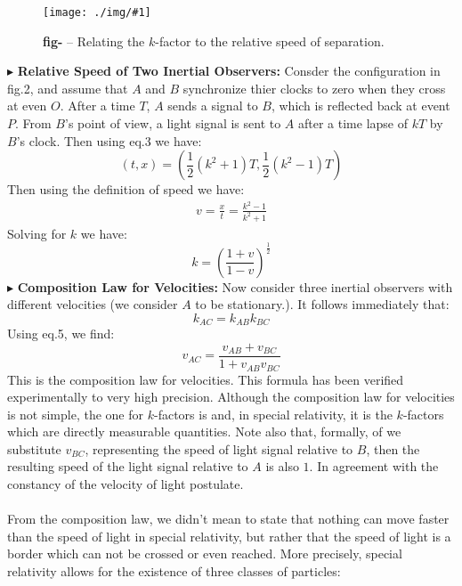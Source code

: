 \documentclass[10pt,a4paper,twocolumn]{article}
\newcounter{def}
\newcounter{figurecounter}
\newcommand{\img}[3]{
    \begin{figure}[h!]
        \centering
        \captionsetup{justification=centering,margin=0cm,labelformat=empty}
        \texttt{[image: ./img/\#1]}
        \label{figure}
        \caption{\small\textbf{fig-\thefigurecounter} -- \textcolor{darkliver}{#3}}
    \end{figure}
    \addtocounter{figurecounter}{1}}
\newcommand{\newpoint}[1]{\indent$\blacktriangleright$ \textbf{#1}}
\begin{document}
                \img{figtwokfactor}{0.8}{Relating the $k$-factor to the relative speed of separation.}
                \newpoint{Relative Speed of Two Inertial Observers: }Consder the configuration in fig.2, and assume that $A$ and $B$ synchronize thier clocks to zero when they cross at even $O$. After a time $T$, $A$ sends a signal to $B$, which is reflected back at event $P$. From $B$'s point of view, a light signal is sent to $A$ after a time lapse of $kT$ by $B$'s clock. Then using eq.3 we have:
                \begin{equation}
                    (t,x) = (\frac12(k^2 + 1)T,\frac12 (k^2-1)T)
                \end{equation}
                Then using the definition of speed we have:
                \begin{align*}
                    v=\frac xt =\frac{k^2-1}{k^2+1}
                \end{align*}
                Solving for $k$ we have:
                \begin{equation}
                    k = \left(\frac{1+v}{1-v}\right)^{\frac12}
                \end{equation}
                \newpoint{Composition Law for Velocities:} Now consider three inertial observers with different velocities (we consider $A$ to be stationary.). It follows immediately that:
                \begin{equation}
                    k_{AC} = k_{AB}k_{BC}
                \end{equation}
                Using eq.5, we find:
                \begin{equation}
                    v_{AC} =\frac{v_{AB}+v_{BC}}{1+v_{AB}v_{BC}}
                \end{equation}
                \indent This is the composition law for velocities. This formula has been verified experimentally to very high precision. Although the composition law for velocities is not simple, the one for $k$-factors is and, in special relativity, it is the $k$-factors which are directly measurable quantities. Note also that, formally, of we substitute $v_{BC}$, representing the speed of light signal relative to $B$, then the resulting speed of the light signal relative to $A$ is also $1$. In agreement with the constancy of the velocity of light postulate. 
                \\
                \\
                \indent From the composition law, we didn't mean to state that nothing can move faster than the speed of light in special relativity, but rather that the speed of light is a border which can not be crossed or even reached. More precisely, special relativity allows for the existence of three classes of particles:
\end{document}
